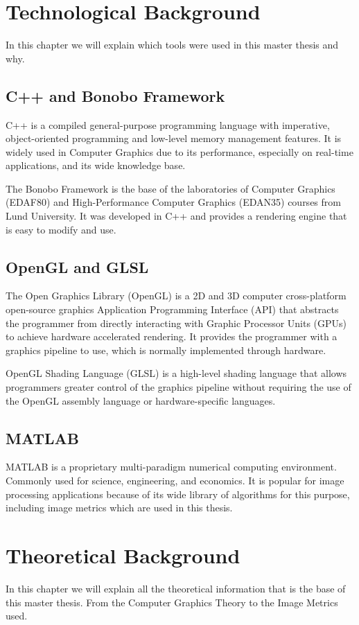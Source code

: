 \documentclass{cslthse-msc}
\begin{document}
\chapter{Technological Background}
In this chapter we will explain which tools were used in this master thesis and why.
\section{C++ and Bonobo Framework}
C++ is a compiled general-purpose programming language with imperative, object-oriented programming and low-level memory management features. It is widely used in Computer Graphics due to its performance, especially on real-time applications, and its wide knowledge base.

The Bonobo Framework is the base of the laboratories of Computer Graphics (EDAF80) and High-Performance Computer Graphics (EDAN35) courses from Lund University. It was developed in C++ and provides a rendering engine that is easy to modify and use.
\section{OpenGL and GLSL}
The Open Graphics Library (OpenGL) is a 2D and 3D computer cross-platform open-source graphics Application Programming Interface (API) that abstracts the programmer from directly interacting with Graphic Processor Units (GPUs) to achieve hardware accelerated rendering. It provides the programmer with a graphics pipeline to use, which is normally implemented through hardware.

OpenGL Shading Language (GLSL) is a high-level shading language that allows programmers greater control of the graphics pipeline without requiring the use of the OpenGL assembly language or hardware-specific languages. 
\section{MATLAB}
MATLAB is a proprietary multi-paradigm numerical computing environment. Commonly used for science, engineering, and economics. It is popular for image processing applications because of its wide library of algorithms for this purpose, including image metrics which are used in this thesis.   

\chapter{Theoretical Background}
In this chapter we will explain all the theoretical information that is the base of this master thesis. From the Computer Graphics Theory to the Image Metrics used.
\end{document}
